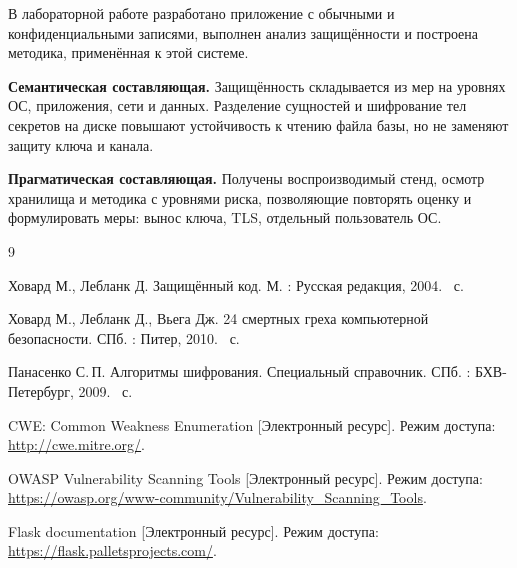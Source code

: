 
В лабораторной работе разработано приложение с обычными и конфиденциальными записями, выполнен анализ защищённости и построена методика, применённая к этой системе.

\textbf{Семантическая составляющая.} Защищённость складывается из мер на уровнях ОС, приложения, сети и данных. Разделение сущностей и шифрование тел секретов на диске повышают устойчивость к чтению файла базы, но не заменяют защиту ключа и канала.

\textbf{Прагматическая составляющая.} Получены воспроизводимый стенд, осмотр хранилища и методика с уровнями риска, позволяющие повторять оценку и формулировать меры: вынос ключа, TLS, отдельный пользователь ОС.

\begin{thebibliography}{9}

	Ховард М., Лебланк Д. Защищённый код. \mdash  М. : Русская редакция, 2004. ~с.

	Ховард М., Лебланк Д., Вьега Дж. 24 смертных греха компьютерной безопасности. \mdash  СПб. : Питер, 2010. ~с.

	Панасенко С.\,П. Алгоритмы шифрования. Специальный справочник. \mdash  СПб. : БХВ-Петербург, 2009. ~с.

	CWE: Common Weakness Enumeration [Электронный ресурс]. \mdash  Режим доступа: \url{http://cwe.mitre.org/}.

	OWASP Vulnerability Scanning Tools [Электронный ресурс]. \mdash  Режим доступа: \url{https://owasp.org/www-community/Vulnerability_Scanning_Tools}.

	Flask documentation [Электронный ресурс]. \mdash  Режим доступа: \url{https://flask.palletsprojects.com/}.
\end{thebibliography}
